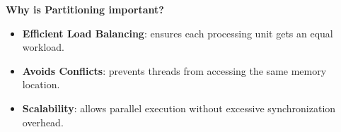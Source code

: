 \highspace
\begin{flushleft}
    \textcolor{Green3}{ \textbf{Why is Partitioning important?}}
\end{flushleft}
\begin{itemize}[label=\textcolor{Green3}{}]
    \item \textcolor{Green3}{\textbf{Efficient Load Balancing}}: ensures each processing unit gets an equal workload.
    \item \textcolor{Green3}{\textbf{Avoids Conflicts}}: prevents threads from accessing the same memory location.
    \item \textcolor{Green3}{\textbf{Scalability}}: allows parallel execution without excessive synchronization overhead.
\end{itemize}
